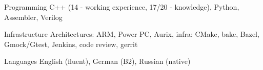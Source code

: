 


\begin{cvskills}


\cvskill
{Programming} %
{C++ (14 - working experience, 17/20 - knowledge), Python, Assembler, Verilog} %


\cvskill
{Infrastructure} %
{Architectures: ARM, Power PC, Aurix, infra: CMake, bake, Bazel, Gmock/Gtest, Jenkins, code review, gerrit} %


\cvskill
{Languages} %
{English (fluent), German (B2), Russian (native)} %


\end{cvskills}